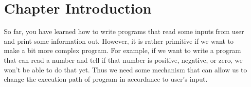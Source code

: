 \documentclass[../main.tex]{subfiles}
\begin{document}
    \section{Chapter Introduction}
So far, you have learned how to write programs that read some inputs from user
and print some information out. However, it is rather primitive if we want to
make a bit more complex program. For example, if we want to write a program that
can read a number and tell if that number is positive, negative, or zero, we
won't be able to do that yet. Thus we need some mechanism that can allow us to
change the execution path of program in accordance to user's input.
\end{document}
